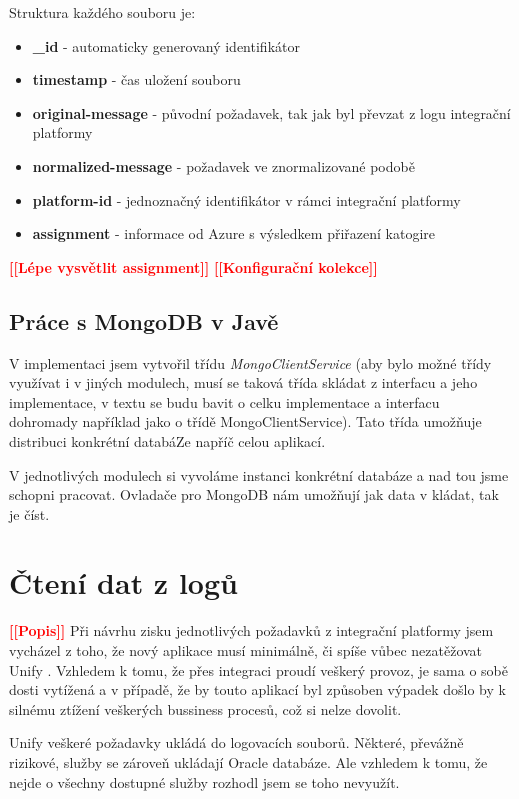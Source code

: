\documentclass[thesis=M,czech]{FITthesis}[2012/10/20]
\newcommand{\todo}[1]{\textcolor{red}{\textbf{[[#1]]}}}
\begin{document}
			Struktura každého souboru je: 
			
			\begin{itemize} 
				\item \textbf{\_id} - automaticky generovaný identifikátor
				\item \textbf{timestamp} - čas uložení souboru
				\item \textbf{original-message} - původní požadavek, tak jak byl převzat z logu integrační platformy
				\item \textbf{normalized-message} - požadavek ve znormalizované podobě
				\item \textbf{platform-id} - jednoznačný identifikátor v rámci integrační platformy
				\item \textbf{assignment} - informace od Azure s výsledkem přiřazení katogire 	
			\end{itemize}
		
		\todo{Lépe vysvětlit assignment}
		\todo{Konfigurační kolekce}
		
		\subsection{Práce s MongoDB v Javě}
		V implementaci jsem vytvořil třídu \textit{MongoClientService} (aby bylo možné třídy využívat i v jiných modulech, musí se taková třída skládat z interfacu a jeho implementace, v textu se budu bavit o celku implementace a interfacu dohromady například jako o třídě MongoClientService). Tato třída umožňuje distribuci konkrétní databáZe napříč celou aplikací. 
		
		V jednotlivých modulech si vyvoláme instanci konkrétní databáze a nad tou jsme schopni pracovat. Ovladače pro MongoDB nám umožňují jak data v kládat, tak je číst.
		
		
		
		
	\section{Čtení dat z logů}
		\todo{Popis}				
		Při návrhu zisku jednotlivých požadavků z integrační platformy jsem vycházel z toho, že nový aplikace musí minimálně, či spíše vůbec nezatěžovat Unify \cite{unify}. Vzhledem k tomu, že přes integraci proudí veškerý provoz, je sama o sobě dosti vytížená a v případě, že by touto aplikací byl způsoben výpadek došlo by k silnému ztížení veškerých bussiness procesů, což si nelze dovolit.
		
		Unify veškeré požadavky ukládá do logovacích souborů. Některé, převážně rizikové, služby se zároveň ukládají Oracle databáze. Ale vzhledem k tomu, že nejde o všechny dostupné služby rozhodl jsem se toho nevyužít.
		
\end{document}
